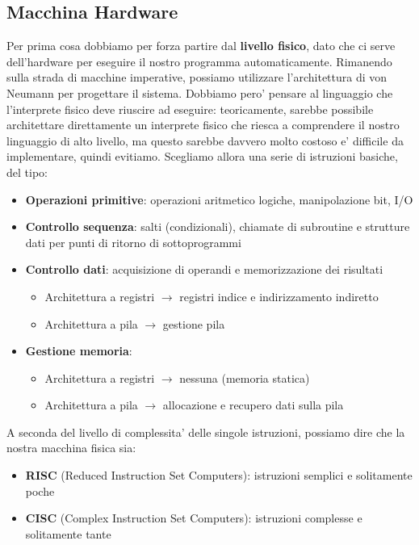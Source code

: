 \subsection{Macchina Hardware}
Per prima cosa dobbiamo per forza partire dal \textbf{livello fisico}, dato che ci serve dell'hardware per eseguire il nostro programma automaticamente. Rimanendo sulla strada di macchine imperative, possiamo utilizzare l'architettura di von Neumann per progettare il sistema. Dobbiamo pero' pensare al linguaggio che l'interprete fisico deve riuscire ad eseguire: teoricamente, sarebbe possibile architettare direttamente un interprete fisico che riesca a comprendere il nostro linguaggio di alto livello, ma questo sarebbe davvero molto costoso e' difficile da implementare, quindi evitiamo. Scegliamo allora una serie di istruzioni basiche, del tipo:
\begin{itemize}
  \item \textbf{Operazioni primitive}: operazioni aritmetico logiche, manipolazione bit, I/O
  \item \textbf{Controllo sequenza}: salti (condizionali), chiamate di subroutine e strutture dati per punti di ritorno di sottoprogrammi
  \item \textbf{Controllo dati}: acquisizione di operandi e memorizzazione dei risultati
    \begin{itemize}
      \item Architettura a registri $ \to $ registri indice e indirizzamento indiretto
      \item Architettura a pila $ \to $ gestione pila
    \end{itemize}
  \item \textbf{Gestione memoria}: 
    \begin{itemize}
      \item Architettura a registri $ \to $ nessuna (memoria statica)
      \item Architettura a pila $ \to $ allocazione e recupero dati sulla pila
    \end{itemize}
\end{itemize}

A seconda del livello di complessita' delle singole istruzioni, possiamo dire che la nostra macchina fisica sia:
\begin{itemize}
  \item \textbf{RISC} (Reduced Instruction Set Computers): istruzioni semplici e solitamente poche
  \item \textbf{CISC} (Complex Instruction Set Computers): istruzioni complesse e solitamente tante
\end{itemize}

